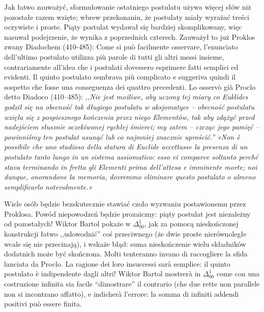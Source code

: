 Jak łatwo zauważyć, sformułowanie ostatniego postulatu używa więcej słów niż pozostałe razem wzięte; wbrew przekonaniu, że postulaty miały wyrażać treści oczywiste i proste. %
Piąty postulat wydawał się bardziej skomplikowany, więc nasuwał podejrzenie, że wynika z poprzednich czterech. %
Zauważył to już Proklos zwany Diadochem (410-485): %
Come si può facilmente osservare, l'enunciato dell'ultimo postulato utilizza più parole di tutti gli altri messi insieme, contrariamente all'idea che i postulati dovessero esprimere fatti semplici ed evidenti. %
Il quinto postulato sembrava più complicato e suggeriva quindi il sospetto che fosse una conseguenza dei quattro precedenti. %
Lo osservò già Proclo detto Diadoco (410--485): %
\emph{,,Nie jest możliwe, aby uczony tej miary co Euklides godził się na obecność tak długiego postulatu w aksjomatyce -- obecność postulatu wzięła się z pospiesznego kończenia przez niego Elementów, tak aby zdążyć przed nadejściem słusznie oczekiwanej rychłej śmierci; my zatem -- czcząc jego pamięć -- powinniśmy ten postulat usunąć lub co najmniej znacznie uprościć.''} %
\emph{«Non è possibile che uno studioso della statura di Euclide accettasse la presenza di un postulato tanto lungo in un sistema assiomatico: esso vi comparve soltanto perché stava terminando in fretta gli Elementi prima dell'attesa e imminente morte; noi dunque, onorandone la memoria, dovremmo eliminare questo postulato o almeno semplificarlo notevolmente.»} %

\label{pageref:fifth_postulate}%
Wiele osób będzie bezskutecznie stawiać czoło wyzwaniu postawionemu przez Proklosa. %
Powód niepowodzeń będzie prozaiczny: piąty postulat jest niezależny od pozostałych! %
Wiktor Bartol pokaże w $\Delta_{00}^{1}$, jak za pomocą nieskończonej konstrukcji łatwo ,,udowodnić'' coś przeciwnego (że dwie proste nierównoległe wcale się nie przecinają), i wskaże błąd: suma nieskończenie wielu składników dodatnich może być skończona. %
Molti tenteranno invano di raccogliere la sfida lanciata da Proclo. %
La ragione dei loro insuccessi sarà semplice: il quinto postulato è indipendente dagli altri! %
Wiktor Bartol mostrerà in $\Delta_{00}^{1}$ come con una costruzione infinita sia facile ``dimostrare'' il contrario (che due rette non parallele non si incontrano affatto), e indicherà l'errore: la somma di infiniti addendi positivi può essere finita. %

